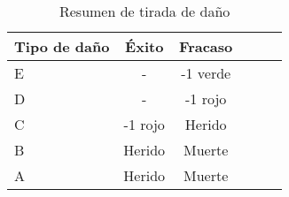 \begin{table}[ht]
\centering
\begin{tabular}{lccccl}
\toprule
Tipo de daño  & Éxito & Fracaso \\\midrule\midrule
E             &  -    & -1 verde \\\midrule
D             &  -    & -1 rojo\\\midrule
C             & -1 rojo  & Herido  \\\midrule
B             & Herido & Muerte \\\midrule
A             & Herido & Muerte \\\midrule
\bottomrule
\end{tabular}
\caption{Resumen de tirada de daño}
\end{table}






